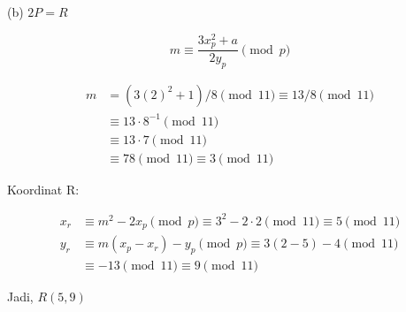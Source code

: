 \documentclass{article}
\begin{document}

(b) $2P = R$

\[ m \equiv \frac{3x_p^2 + a}{2y_p} \pmod{p} \]

\begin{align*}
 m &= (3(2)^2 + 1)/8 \pmod{11} \equiv 13/8 \pmod{11} \\
 &\equiv 13 \cdot 8^{-1} \pmod{11} \\
 &\equiv 13 \cdot 7 \pmod{11} \\
 &\equiv 78 \pmod{11} \equiv 3 \pmod{11} 
\end{align*}

Koordinat R:

\begin{align*}
 x_r &\equiv m^2 - 2x_p \pmod{p} \equiv 3^2 - 2 \cdot 2 \pmod{11} \equiv 5 \pmod{11} \\
 y_r &\equiv m(x_p - x_r) - y_p \pmod{p} \equiv 3(2 - 5) - 4 \pmod{11} \\
 &\equiv -13 \pmod{11} \equiv 9 \pmod{11} 
\end{align*}

Jadi, $R(5, 9)$
\end{document}
